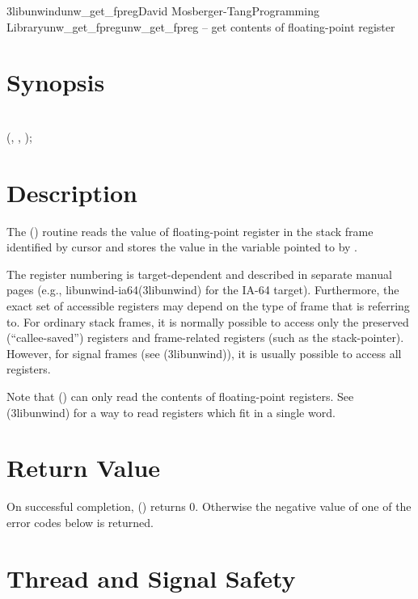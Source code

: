 \documentclass{article}
\begin{document}
\begin{Name}{3libunwind}{unw\_get\_fpreg}{David Mosberger-Tang}{Programming Library}{unw\_get\_fpreg}unw\_get\_fpreg -- get contents of floating-point register
\end{Name}

\section{Synopsis}

\\

 (,  , );\\

\section{Description}

The () routine reads the value of floating-point
register  in the stack frame identified by cursor 
and stores the value in the variable pointed to by .

The register numbering is target-dependent and described in separate
manual pages (e.g., libunwind-ia64(3libunwind) for the IA-64 target).
Furthermore, the exact set of accessible registers may depend on the
type of frame that  is referring to.  For ordinary stack
frames, it is normally possible to access only the preserved
(``callee-saved'') registers and frame-related registers (such as the
stack-pointer).  However, for signal frames (see
(3libunwind)), it is usually possible to access
all registers.

Note that () can only read the contents of
floating-point registers.  See (3libunwind) for a way to
read registers which fit in a single word.

\section{Return Value}

On successful completion, () returns 0.
Otherwise the negative value of one of the error codes below is
returned.

\section{Thread and Signal Safety}
\end{document}
